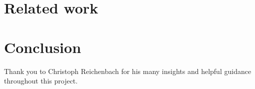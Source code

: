 \documentclass[sigplan,10pt]{acmart}
\begin{document}
\section{Related work}

\section{Conclusion}

\begin{acks}
Thank you to Christoph Reichenbach for his many insights and helpful guidance throughout this project.
\end{acks}

\newpage


\end{document}
